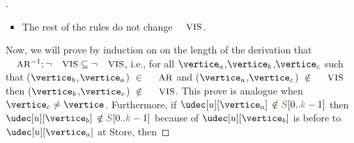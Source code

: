 \begin{proof}[]
\begin{itemize}
\begin{itemize}
\begin{itemize}
				\end{itemize}
				
			\item The rest of the rules do not change $\textsc{\small{VIS}}$.

\end{itemize}

\end{itemize}

Now, we will prove by induction on on the length of the derivation that $\textsc{\small{AR}}^{-1};\neg\textsc{\small{VIS}} \subseteq \neg\textsc{\small{VIS}}$, i.e., for all $\vertice_a$,$\vertice_b$,$\vertice_c$ such that ($\vertice_b$,$\vertice_a$) $\in$ $\textsc{\small{AR}}$ and ($\vertice_a$,$\vertice_c$) $\notin$ $\textsc{\small{VIS}}$ then ($\vertice_b$,$\vertice_c$) $\notin$ $\textsc{\small{VIS}}$. This prove is analogue when $\vertice_c \neq \vertice$. Furthermore, if $\udec[u][\vertice_a]$ $\notin \queuemessage[0..\tknown-1]$ then $\udec[u][\vertice_b]$ $\notin \queuemessage[0..\tknown-1]$ because of $\udec[u][\vertice_b]$ is before to $\udec[u][\vertice_a]$ at Store, then 
\end{proof}
	




